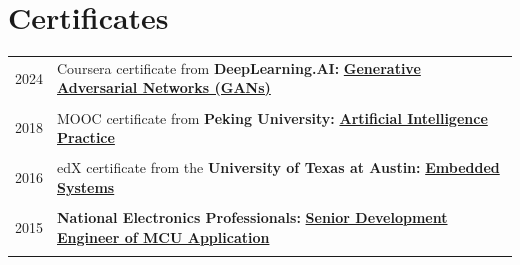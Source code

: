 \documentclass[a4paper,10pt]{article} %
\begin{document}
\section{Certificates}
\begin{tabular}{r|l}	


2024                        & Coursera certificate from \textbf{DeepLearning.AI:} \href{https://way2ml.github.io/_static/cv/2024-11-28-00-38-Coursera_52U3R05DPCRA.pdf}{\textbf{Generative Adversarial Networks (GANs)}}\\
\multicolumn{2}{c}{} \\	%

2018                        & MOOC certificate from \textbf{Peking University:} \href{https://way2ml.github.io/_static/cv/2021_11_26_10_Peking_AI.png}{\textbf{Artificial Intelligence Practice}}\\
\multicolumn{2}{c}{} \\	%

2016                        & edX certificate from the \textbf{University of Texas at Austin:} \href{https://way2ml.github.io/_static/cv/2021_11_26_09_UTAustinX_UT.6.03x_Certificate_edX.pdf}{\textbf{Embedded Systems} }\\   	
\multicolumn{2}{c}{} \\	%

2015                     & 
\textbf{National Electronics Professionals:}  \href{https://way2ml.github.io/_static/cv/2021_11_26_12_8.png}{\textbf{Senior Development Engineer of MCU Application}}\\
\multicolumn{2}{c}{} \\	%



\end{tabular}
\end{document}
